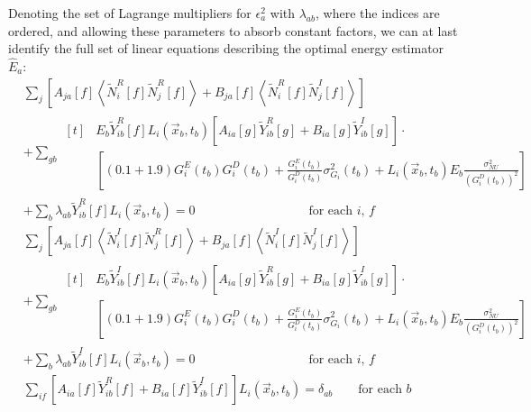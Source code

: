 Denoting the set of Lagrange multipliers for $\epsilon^2_a$ with $\lambda_{ab}$, where the indices are ordered, and allowing these parameters to absorb constant factors, we can at last identify the full set of linear equations describing the optimal energy estimator $\widehat{E}_a$:
\begin{subequations}\begin{align}
&\sum_j \left[ A_{ja}[f] \left<\widetilde{N}_i^R[f]\widetilde{N}_j^R[f]\right> + B_{ja}[f] \left<\widetilde{N}_i^R[f]\widetilde{N}_j^I[f]\right>\right]\nonumber\\
&+ \sum_{gb} \begin{aligned}[t]
  & E_b\widetilde{Y}_{ib}^R[f] L_i(\vec{x}_b,t_b)\left[A_{ia}[g] \widetilde{Y}_{ib}^R[g] + B_{ia}[g] \widetilde{Y}_{ib}^I[g]\right] \cdot \\
  & \left[ (0.1 + 1.9) G^E_i(t_b) G^D_i(t_b) + \frac{G^E_i(t_b)}{G^D_i(t_b)} \sigma^2_{G_i}(t_b) + L_i(\vec{x}_b,t_b) E_b \frac{\sigma^2_{NU}}{\left(G^D_i(t_b)\right)^2} \right] \end{aligned} \nonumber \\
&+ \sum_b \lambda_{ab} \widetilde{Y}^R_{ib}[f] L_i(\vec{x}_b,t_b) = 0 \qquad \qquad \qquad \qquad \quad \text{for each $i$, $f$}\\
%
&\sum_j \left[ A_{ja}[f] \left<\widetilde{N}_i^I[f]\widetilde{N}_j^R[f]\right> + B_{ja}[f] \left<\widetilde{N}_i^I[f]\widetilde{N}_j^I[f]\right>\right]\nonumber\\
&+ \sum_{gb} \begin{aligned}[t]
  & E_b\widetilde{Y}_{ib}^I[f] L_i(\vec{x}_b,t_b)\left[A_{ia}[g] \widetilde{Y}_{ib}^R[g] + B_{ia}[g] \widetilde{Y}_{ib}^I[g]\right] \cdot \\
  & \left[ (0.1 + 1.9) G^E_i(t_b) G^D_i(t_b) + \frac{G^E_i(t_b)}{G^D_i(t_b)} \sigma^2_{G_i}(t_b) + L_i(\vec{x}_b,t_b) E_b \frac{\sigma^2_{NU}}{\left(G^D_i(t_b)\right)^2} \right] \end{aligned} \nonumber\\
&+ \sum_b \lambda_{ab} \widetilde{Y}^I_{ib}[f] L_i(\vec{x}_b,t_b) = 0 \qquad \qquad \qquad \qquad \quad \text{for each $i$, $f$}\\
%
&\sum_{if}\left[A_{ia}[f] \widetilde{Y}_{ib}^R[f] + B_{ia}[f] \widetilde{Y}_{ib}^I[f]\right] L_i(\vec{x}_b,t_b) = \delta_{ab} \qquad \text{for each $b$}
\end{align}\end{subequations}


